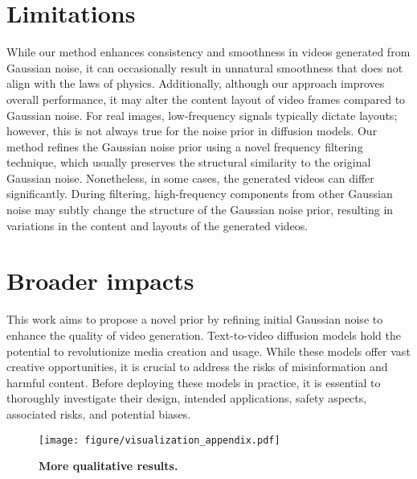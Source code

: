 \section{Limitations}
While our method enhances consistency and smoothness in videos generated from Gaussian noise, it can occasionally result in unnatural smoothness that does not align with the laws of physics. 
Additionally, although our approach improves overall performance, it may alter the content layout of video frames compared to Gaussian noise. For real images, low-frequency signals typically dictate layouts; however, this is not always true for the noise prior in diffusion models. 
Our method refines the Gaussian noise prior using a novel frequency filtering technique, which usually preserves the structural similarity to the original Gaussian noise. Nonetheless, in some cases, the generated videos can differ significantly. During filtering, high-frequency components from other Gaussian noise may subtly change the structure of the Gaussian noise prior, resulting in variations in the content and layouts of the generated videos.


\section{Broader impacts}
\label{appendix:impacts}
This work aims to propose a novel prior by refining initial Gaussian noise to enhance the quality of video generation. 
Text-to-video diffusion models hold the potential to revolutionize media creation and usage. While these models offer vast creative opportunities, it is crucial to address the risks of misinformation and harmful content. 
Before deploying these models in practice, it is essential to thoroughly investigate their design, intended applications, safety aspects, associated risks, and potential biases.

\begin{figure}[t]
    \centering
    \texttt{[image: figure/visualization\_appendix.pdf]}
    \caption{{\bf More qualitative results.}}
    \label{fig:appendix_vis}
\end{figure}
